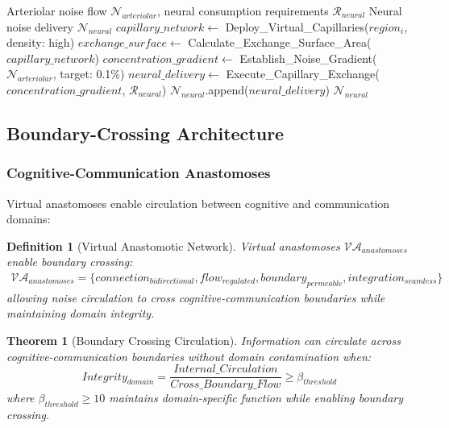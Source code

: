 \documentclass[12pt,a4paper]{article}
\newtheorem{theorem}{Theorem}
\newtheorem{definition}{Definition}
\begin{document}
\begin{algorithm}
\caption{Virtual Capillary Neural Interface}
\begin{algorithmic}[1]
\REQUIRE Arteriolar noise flow $\mathcal{N}_{arteriolar}$, neural consumption requirements $\mathcal{R}_{neural}$
\ENSURE Neural noise delivery $\mathcal{N}_{neural}$
    \STATE $capillary\_network \leftarrow$ Deploy\_Virtual\_Capillaries($region_i$, density: high)
    \STATE $exchange\_surface \leftarrow$ Calculate\_Exchange\_Surface\_Area($capillary\_network$)
    \STATE $concentration\_gradient \leftarrow$ Establish\_Noise\_Gradient($\mathcal{N}_{arteriolar}$, target: 0.1\%)
    \STATE $neural\_delivery \leftarrow$ Execute\_Capillary\_Exchange($concentration\_gradient$, $\mathcal{R}_{neural}$)
    \STATE $\mathcal{N}_{neural}$.append($neural\_delivery$)
\ENDFOR
\RETURN $\mathcal{N}_{neural}$
\end{algorithmic}
\end{algorithm}

\subsection{Boundary-Crossing Architecture}

\subsubsection{Cognitive-Communication Anastomoses}

Virtual anastomoses enable circulation between cognitive and communication domains:

\begin{definition}[Virtual Anastomotic Network]
Virtual anastomoses $\mathcal{VA}_{anastomoses}$ enable boundary crossing:
\begin{align}
\mathcal{VA}_{anastomoses} = \{connection_{bidirectional}, flow_{regulated}, boundary_{permeable}, integration_{seamless}\}
\end{align}
allowing noise circulation to cross cognitive-communication boundaries while maintaining domain integrity.
\end{definition}

\begin{theorem}[Boundary Crossing Circulation]
Information can circulate across cognitive-communication boundaries without domain contamination when:
\begin{equation}
Integrity_{domain} = \frac{Internal\_Circulation}{Cross\_Boundary\_Flow} \geq \beta_{threshold}
\end{equation}
where $\beta_{threshold} \geq 10$ maintains domain-specific function while enabling boundary crossing.
\end{theorem}
\end{document}
